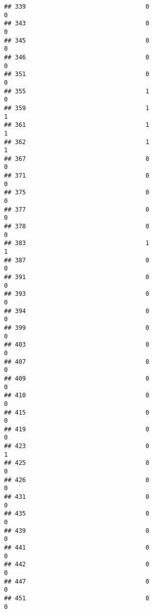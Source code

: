 \documentclass[
]{article}
\begin{document}
\begin{verbatim}
## 339                                 0                                0
## 343                                 0                                0
## 345                                 0                                0
## 346                                 0                                0
## 351                                 0                                0
## 355                                 1                                0
## 359                                 1                                1
## 361                                 1                                1
## 362                                 1                                1
## 367                                 0                                0
## 371                                 0                                0
## 375                                 0                                0
## 377                                 0                                0
## 378                                 0                                0
## 383                                 1                                1
## 387                                 0                                0
## 391                                 0                                0
## 393                                 0                                0
## 394                                 0                                0
## 399                                 0                                0
## 403                                 0                                0
## 407                                 0                                0
## 409                                 0                                0
## 410                                 0                                0
## 415                                 0                                0
## 419                                 0                                0
## 423                                 0                                1
## 425                                 0                                0
## 426                                 0                                0
## 431                                 0                                0
## 435                                 0                                0
## 439                                 0                                0
## 441                                 0                                0
## 442                                 0                                0
## 447                                 0                                0
## 451                                 0                                0

\end{verbatim}
\end{document}
